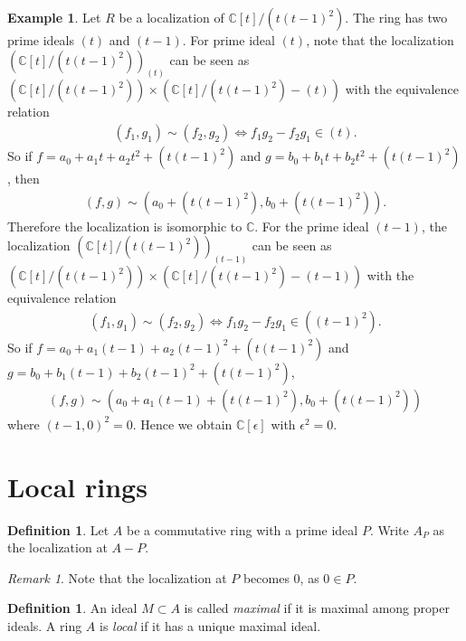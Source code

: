 \documentclass[12pt]{report}
\theoremstyle{plain}
\theoremstyle{remark}
\newtheorem*{remark}{Remark}
\theoremstyle{definition}
\newtheorem{definition}[theorem]{Definition}
\newtheorem{example}[theorem]{Example}
\newcommand{\C}{\mathbb{C}}
\begin{document}
\begin{example}
    Let $R$ be a localization of $\C[t]/(t(t-1)^2)$. The ring has two prime ideals $(t)$ and $(t-1)$. For prime ideal $(t)$, note that the localization $(\C[t]/(t(t-1)^2))_{(t)}$ can be seen as $(\C[t]/(t(t-1)^2))\times (\C[t]/(t(t-1)^2) - (t))$ with the equivalence relation
    \begin{align*}
        (f_1,g_1)\sim (f_2,g_2)\iff f_1 g_2 - f_2g_1\in(t).
    \end{align*}
    So if $f=a_0+a_1t+a_2t^2+(t(t-1)^2)$ and $g=b_0+b_1t+b_2t^2+(t(t-1)^2)$, then
    \begin{align*}
        (f,g)\sim (a_0+(t(t-1)^2),b_0+(t(t-1)^2)).
    \end{align*}
    Therefore the localization is isomorphic to $\C$. For the prime ideal $(t-1)$, the localization $(\C[t]/(t(t-1)^2))_{(t-1)}$ can be seen as $(\C[t]/(t(t-1)^2))\times (\C[t]/(t(t-1)^2) - (t-1))$ with the equivalence relation
    \begin{align*}
        (f_1,g_1)\sim (f_2,g_2)\iff f_1 g_2 - f_2g_1\in((t-1)^2).
    \end{align*}
    So if $f=a_0+a_1(t-1)+a_2(t-1)^2+(t(t-1)^2)$ and $g=b_0+b_1(t-1)+b_2(t-1)^2+(t(t-1)^2)$,
    \begin{align*}
        (f,g)\sim (a_0+a_1(t-1)+(t(t-1)^2),b_0+(t(t-1)^2))
    \end{align*}
    where $(t-1,0)^2=0$. Hence we obtain $\C[\epsilon]$ with $\epsilon^2=0$.
\end{example}


\section{Local rings}
\begin{definition}
    Let $A$ be a commutative ring with a prime ideal $P$. Write $A_P$ as the localization at $A-P$.
\end{definition}
\begin{remark}
    Note that the localization at $P$ becomes $0$, as $0\in P$.
\end{remark}

\begin{definition}
    An ideal $M\subset A$ is called \emph{maximal} if it is maximal among proper ideals. A ring $A$ is \emph{local} if it has a unique maximal ideal.
\end{definition}
\end{document}
